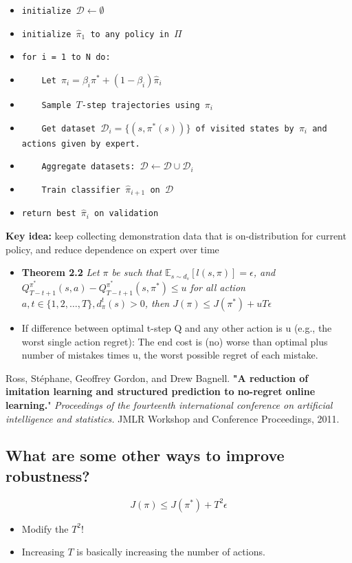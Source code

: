 \documentclass[10pt]{article}
\begin{document}
\begin{itemize}[label={~}]
    \item \texttt{initialize $\mathcal{D} \leftarrow \emptyset$}
    \item \texttt{initialize $\hat{\pi}_1$ to any policy in $\Pi$}
    \item \texttt{for i = 1 to N do:}
    \item \texttt{~~~~Let $\pi_i = \beta_i \pi^* + (1 - \beta_i) \hat{\pi}_i$}
    \item \texttt{~~~~Sample $T$-step trajectories using $\pi_i$}
    \item \texttt{~~~~Get dataset $\mathcal{D}_i = \{(s, \pi^*(s))\}$ of visited states by $\pi_i$ and actions given by expert.}
    \item \texttt{~~~~Aggregate datasets: $\mathcal{D} \leftarrow \mathcal{D} \cup \mathcal{D}_i$}
    \item \texttt{~~~~Train classifier $\hat{\pi}_{i + 1}$ on $\mathcal{D}$}
    \item \texttt{return best $\hat{\pi}_i$ on validation}
\end{itemize}
\textbf{Key idea:} keep collecting demonstration data that is on-distribution for current policy, and reduce dependence on expert over time
\begin{itemize}
	\item \textbf{Theorem 2.2} \textit{Let $\pi$ be such that $\mathbb{E}_{s \sim d_s} [l(s, \pi)] = \epsilon$, and $Q_{T - t + 1}^{\pi^*} (s, a) - Q_{T - t + 1}^{\pi^*}(s, \pi^*) \leq u$ for all action $a, t \in \{1, 2, \dots, T\}, d_\pi^t (s) > 0$, then $J(\pi) \leq J(\pi^*) + uT\epsilon$}
	\item If difference between optimal t-step Q and any other action is u (e.g., the worst single action regret): The end cost is (no) worse than optimal plus number of mistakes times u, the worst possible regret of each mistake.
\end{itemize}
Ross, Stéphane, Geoffrey Gordon, and Drew Bagnell. \textbf{"A reduction of imitation learning and structured prediction to no-regret online learning.}" \textit{Proceedings of the fourteenth international conference on artificial intelligence and statistics.} JMLR Workshop and Conference Proceedings, 2011.

\subsection*{What are some other ways to improve robustness?}
\[J(\pi) \leq J(\pi^*) + T^2 \epsilon\]
\begin{itemize}
	\item Modify the $T^2$!
	\item Increasing $T$ is basically increasing the number of actions.
\end{itemize}
\end{document}
